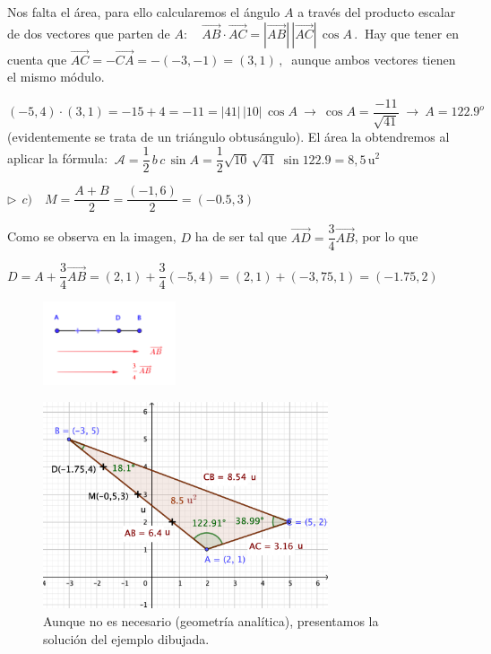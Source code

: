 \begin{miejemplo}
\vspace{2mm} Nos falta el área, para ello calcularemos el ángulo $A$ a través del producto escalar de dos vectores que parten de $A: \quad \overrightarrow{AB} \cdot \overrightarrow{AC}= |\overrightarrow{AB}|\, |\overrightarrow{AC}|\, \cos A\, . \ $ Hay que tener en cuenta que $\overrightarrow{AC}=-\overrightarrow{CA}=-(-3,-1)=(3,1)\, , \ $ aunque ambos vectores tienen el mismo módulo.

\vspace{2mm} $ (-5,4)\cdot (3,1)=-15+4=-11=|41|\, |10|\, \cos A \ \to \ \cos A=\dfrac{-11}{\sqrt{41}} \ \to \ A=122.9^o \ $ (evidentemente se trata de un triángulo obtusángulo). El área la obtendremos al aplicar la fórmula: $\ \mathcal A=\dfrac 1 2\,  b\, c\, \sin A=\dfrac 1 2 \sqrt{10}\, \sqrt{41}\ \sin 122.9 = 8,5\, \mathrm{u}^2$

\vspace{4mm} $\triangleright \ \ c)\quad M=\dfrac{A+B}{2}=\dfrac{(-1,6)}{2}=(-0.5,3)$
\begin{multicols}{2}
Como se observa en la imagen, $D$ ha de ser tal que $\overrightarrow{AD}=\dfrac 3 4 \overrightarrow{AB}$, por lo que 

\vspace{2mm} $D=A+\dfrac 3 4 \overrightarrow{AB}=(2,1)+\dfrac 3 4 (-5,4)=(2,1)+(-3,75,1)=(-1.75,2)$
 \begin{figure}[H]
	\centering
	\includegraphics[width=0.35\textwidth]{img-ga/ga09.png}
\end{figure}
\end{multicols}
\end{miejemplo}

 \begin{figure}[H]
	\centering
	\includegraphics[width=0.75\textwidth]{img-ga/ga10.png}
	\caption*{\footnotesize{Aunque no es necesario (geometría analítica), presentamos la solución del ejemplo dibujada.}}
\end{figure}


